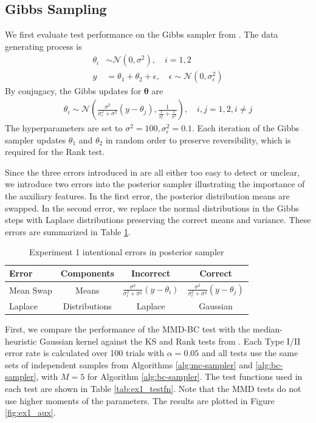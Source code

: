 \documentclass[a4paper,12pt]{article}
\begin{document}
\subsection{Gibbs Sampling}
We first evaluate test performance on the Gibbs sampler from \cite{gandy_unit_2020}. The data generating process is
\begin{align}
    \theta_i &\sim \mathcal{N}(0, \sigma^2), \quad i=1,2 \\
    y &= \theta_1 + \theta_2 + \epsilon, \quad \epsilon \sim \mathcal{N}(0, \sigma_\epsilon^2)
\end{align}
By conjugacy, the Gibbs updates for $\mathbf{\theta}$ are
\begin{align}
\theta_{i} \sim \mathcal{N}\left(
\frac{\sigma^{2}}{\sigma_{\epsilon}^{2}+\sigma^{2}}\left(y-\theta_{j}\right)
, \frac{1}{\frac{1}{\sigma_{\epsilon}^{2}}+\frac{1}{\sigma^{2}}}\right), \quad i,j=1,2, i \neq j
\end{align}
The hyperparameters are set to $\sigma^{2}=100, \sigma_{\epsilon}^{2}=0.1$. Each iteration of the Gibbs sampler updates $\theta_{1}$ and $\theta_{2}$ in random order to preserve reversibility, which is required for the Rank test.

Since the three errors introduced in \cite{gandy_unit_2020} are all either too easy to detect or unclear, we introduce two errors into the posterior sampler illustrating the importance of the auxiliary features. In the first error, the posterior distribution means are swapped. In the second error, we replace the normal distributions in the Gibbs steps with Laplace distributions preserving the correct means and variance. These errors are summarized in Table \ref{tab:ex1_errors}.

\begin{table}[H]
    \centering
    \begin{tabular}{l|c|c|c}
         Error  & Components & Incorrect & Correct \\
         \hline
         Mean Swap & Means &  $\frac{\sigma^{2}}{\sigma_{\epsilon}^{2}+\sigma^{2}}\left(y-\theta_{i}\right)$ & $\frac{\sigma^{2}}{\sigma_{\epsilon}^{2}+\sigma^{2}}\left(y-\theta_{j}\right)$\\
         Laplace & Distributions & Laplace & Gaussian \\
    \end{tabular}
    \caption{Experiment 1 intentional errors in posterior sampler}
    \label{tab:ex1_errors}
\end{table}

First, we compare the performance of the MMD-BC test with the median-heuristic Gaussian kernel against the KS and Rank tests from \cite{gandy_unit_2020}. Each Type I/II error rate is calculated over 100 trials with $\alpha=0.05$ and all tests use the same sets of independent samples from Algorithms \ref{alg:mc-sampler} and \ref{alg:bc-sampler}, with $M=5$ for Algorithm \ref{alg:bc-sampler}. The test functions used in each test are shown in Table \ref{tab:ex1_testfn}. Note that the MMD tests do not use higher moments of the parameters. The results are plotted in Figure \ref{fig:ex1_aux}.
\end{document}
